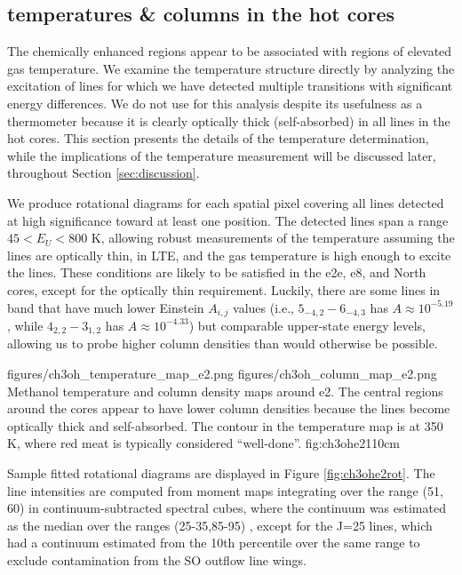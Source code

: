 \documentclass{emulateapj}
\begin{document}
\subsection{\methanol temperatures \& columns in the hot cores}
\label{sec:ch3ohtem}
\label{sec:methanol}
The  chemically enhanced regions appear to be associated with regions of
elevated gas temperature.  We examine the temperature structure directly by
analyzing the excitation of lines for which we have detected multiple
transitions with significant energy differences.  We do not use \formaldehyde
for this analysis despite its usefulness as a thermometer because it is clearly
optically thick (self-absorbed) in all lines in the hot cores.
This section presents the details of the temperature determination, while 
the implications of the temperature measurement will be discussed later,
throughout Section \ref{sec:discussion}.

We produce rotational diagrams for each spatial pixel covering all \methanol lines
detected at high significance toward at least one position.  The detected lines
span a range $45 < E_U < 800$ K, allowing robust measurements of the temperature
assuming the lines are optically thin, in LTE, and the gas temperature is high
enough to excite the lines.  These conditions are likely to be satisfied in the
e2e, e8, and North cores, except for the optically thin requirement.  Luckily,
there are some lines in band that have much lower Einstein $A_{i,j}$ values 
(i.e., \methanol $5_{-4,2} - 6_{-4,3}$ has $A\approx10^{-5.19}$, while
\methanol $4_{2,2}-3_{1,2}$ has $A\approx10^{-4.33}$)
but comparable upper-state energy levels, allowing us to probe higher column
densities than would otherwise be possible.

\FigureTwo
{figures/ch3oh_temperature_map_e2.png}
{figures/ch3oh_column_map_e2.png}
{Methanol temperature and column density maps around e2.  The central regions around
the cores appear to have lower column densities because the lines become
optically thick and self-absorbed.  The contour in the temperature map is at
350 K, where red meat is typically considered ``well-done''.}
{fig:ch3ohe2}{1}{10cm}

Sample fitted rotational diagrams are displayed in Figure \ref{fig:ch3ohe2rot}.
The line intensities are computed from moment maps integrating over the range
(51, 60) \kms in continuum-subtracted spectral cubes, where the continuum
was estimated as the median over the ranges (25-35,85-95) \kms, except
for the J=25 lines, which had a continuum estimated from the 10th percentile
over the same range to exclude contamination from the SO outflow line wings.
\end{document}
